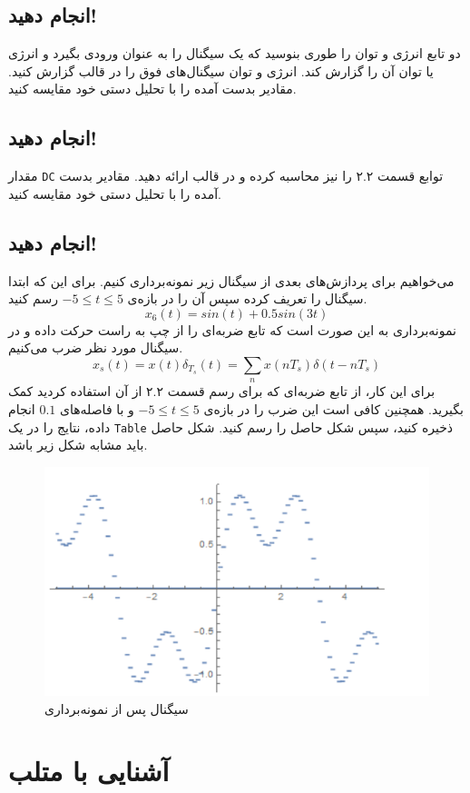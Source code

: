 \documentclass{utsignal}
\begin{document}
	\subsection{انجام دهید!}
	دو تابع انرژی و توان را طوری بنوسید که یک سیگنال را به عنوان ورودی بگیرد و انرژی یا توان آن را گزارش کند. انرژی و توان سیگنال‌های فوق را در قالب  گزارش کنید. مقادیر بدست آمده را با تحلیل دستی خود مقایسه کنید.
	\subsection{انجام دهید!}
	مقدار \lstinline{DC} توابع قسمت ۲.۲ را نیز محاسبه کرده و در قالب   ارائه دهید. مقادیر بدست آمده را با تحلیل دستی خود مقایسه کنید.
	\subsection{انجام دهید!}
	می‌خواهیم برای پردازش‌های بعدی از سیگنال زیر نمونه‌برداری کنیم. برای این که ابتدا سیگنال را تعریف کرده سپس آن را در بازه‌ی $-5 \le t \le 5$ رسم کنید.
	$$x_6(t) = sin(t) + 0.5 sin(3t)$$
	نمونه‌برداری به این صورت است که تابع ضربه‌ای را از چپ به راست حرکت داده و در سیگنال مورد نظر ضرب می‌کنیم.
	$$x_s(t) = x(t)\delta_T_s(t) = \sum_{n} x(nT_s)\delta(t-nT_s)$$
	برای این کار، از تابع ضربه‌ای که برای رسم قسمت ۲.۲ از آن استفاده کردید کمک بگیرید. همچنین کافی است این ضرب را در بازه‌ی $-5 \le t \le 5$ و با فاصله‌های $0.1$ انجام داده، نتایج را در یک \lstinline{Table} ذخیره کنید، سپس شکل حاصل را رسم کنید. شکل حاصل باید مشابه شکل زیر باشد.
	\begin{figure}[h]
		\centering
		\includegraphics[height=0.3\textheight,keepaspectratio]{sample.png}
		\caption{سیگنال پس از نمونه‌برداری}
	\end{figure}
	
	\section{آشنایی با متلب}
\end{document}
